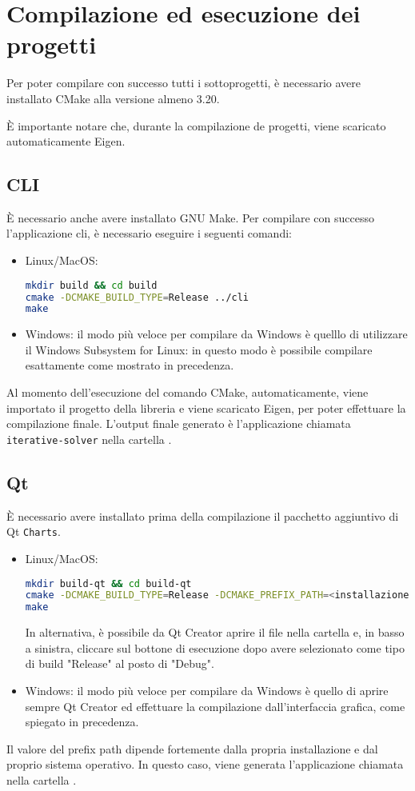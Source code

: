 	\appendix
\section{Compilazione ed esecuzione dei progetti}
Per poter compilare con successo tutti i sottoprogetti, è necessario avere installato CMake alla versione almeno 3.20.

È importante notare che, durante la compilazione de progetti, viene scaricato automaticamente Eigen.

\subsection{CLI}
È necessario anche avere installato GNU Make\cite{Make}.
Per compilare con successo l'applicazione cli, è necessario eseguire i seguenti comandi:
\begin{itemize}
	\item Linux/MacOS: 
	\begin{lstlisting}[language=Bash]
mkdir build && cd build
cmake -DCMAKE_BUILD_TYPE=Release ../cli
make \end{lstlisting}

\item Windows: il modo più veloce per compilare da Windows è quelllo di utilizzare il Windows Subsystem for Linux: in questo modo è possibile compilare esattamente come mostrato in precedenza.
\end{itemize}


Al momento dell'esecuzione del comando CMake, automaticamente, viene importato il progetto della libreria e viene scaricato Eigen, per poter effettuare la compilazione finale. L'output finale generato è l'applicazione chiamata \texttt{iterative-solver} nella cartella .

\subsection{Qt}
È necessario avere installato prima della compilazione il pacchetto aggiuntivo di Qt \texttt{Charts}.
\begin{itemize}
	\item Linux/MacOS: 
	\begin{lstlisting}[language=Bash]
mkdir build-qt && cd build-qt
cmake -DCMAKE_BUILD_TYPE=Release -DCMAKE_PREFIX_PATH=<installazione di Qt>/<versione>/<sistema> ../QTInterface
make \end{lstlisting}
In alternativa, è possibile da Qt Creator aprire il file  nella cartella  e, in basso a sinistra, cliccare sul bottone di esecuzione dopo avere selezionato come tipo di build "Release" al posto di "Debug".

\item Windows: il modo più veloce per compilare da Windows è quello di aprire sempre Qt Creator ed effettuare la compilazione dall'interfaccia grafica, come spiegato in precedenza.
\end{itemize}
Il valore del prefix path dipende fortemente dalla propria installazione e dal proprio sistema operativo. In questo caso, viene generata l'applicazione chiamata  nella cartella .
